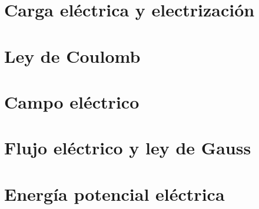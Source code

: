 ﻿\documentclass[11pt,letterpaper,openany]{book}
\newcommand{\rutaraiz}{../..}
\begin{document}
\setcounter{chapter}{77}



\chapter{Carga eléctrica y electrización}





\chapter{Ley de Coulomb}





\chapter{Campo eléctrico}





\chapter{Flujo eléctrico y ley de Gauss}





\chapter{Energía potencial eléctrica}
\end{document}

